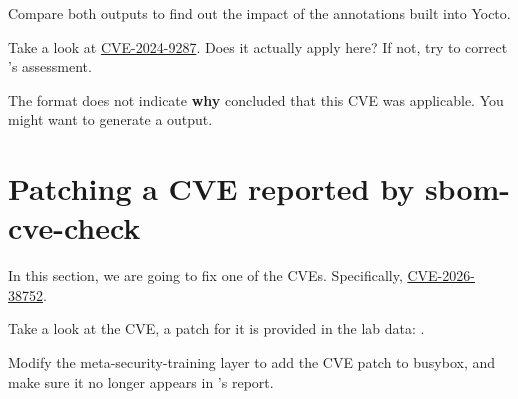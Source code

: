 Compare both outputs to find out the impact of the annotations built into Yocto.


Take a look at \href{https://nvd.nist.gov/vuln/detail/cve-2024-9287}{CVE-2024-9287}. Does it actually apply here?
If not, try to correct 's assessment.

The  format does not indicate \textbf{why}  concluded that this CVE was applicable.
You might want to generate a  output.

\section{Patching a CVE reported by sbom-cve-check}

In this section, we are going to fix one of the CVEs. Specifically, \href{https://nvd.nist.gov/vuln/detail/CVE-2026-38752}{CVE-2026-38752}.

Take a look at the CVE, a patch for it is provided in the lab data:
.

Modify the meta-security-training layer to add the CVE patch to busybox, and
make sure it no longer appears in 's report.

